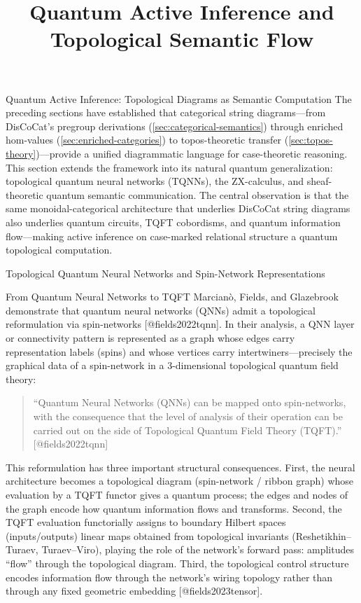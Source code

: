 \documentclass[
  ignorenonframetext,
]{beamer}
\title{\texorpdfstring{Quantum Active Inference and Topological Semantic
Flow}{Quantum Active Inference and Topological Semantic Flow}}
\author{\texorpdfstring{}{}}
\date{}
\begin{document}
\frame{\titlepage}

\begin{frame}{Quantum Active Inference: Topological Diagrams as Semantic
Computation}
\protect{}\label{sec:quantum-active-inference}
The preceding sections have established that categorical string
diagrams---from DisCoCat's pregroup derivations
(\autoref{sec:categorical-semantics}) through enriched hom-values
(\autoref{sec:enriched-categories}) to topos-theoretic transfer
(\autoref{sec:topos-theory})---provide a unified diagrammatic language
for case-theoretic reasoning. This section extends the framework into
its natural quantum generalization: topological quantum neural networks
(TQNNs), the ZX-calculus, and sheaf-theoretic quantum semantic
communication. The central observation is that the same
monoidal-categorical architecture that underlies DisCoCat string
diagrams also underlies quantum circuits, TQFT cobordisms, and quantum
information flow---making active inference on case-marked relational
structure a quantum topological computation.

\begin{block}{Topological Quantum Neural Networks and Spin-Network
Representations}
\protect{}\label{topological-quantum-neural-networks-and-spin-network-representations}
\begin{block}{From Quantum Neural Networks to TQFT}
\protect{}\label{from-quantum-neural-networks-to-tqft}
Marcianò, Fields, and Glazebrook demonstrate that quantum neural
networks (QNNs) admit a topological reformulation via spin-networks
{[}@fields2022tqnn{]}. In their analysis, a QNN layer or connectivity
pattern is represented as a graph whose edges carry representation
labels (spins) and whose vertices carry intertwiners---precisely the
graphical data of a spin-network in a 3-dimensional topological quantum
field theory:

\begin{quote}
``Quantum Neural Networks (QNNs) can be mapped onto spin-networks, with
the consequence that the level of analysis of their operation can be
carried out on the side of Topological Quantum Field Theory (TQFT).''
{[}@fields2022tqnn{]}
\end{quote}

This reformulation has three important structural consequences. First,
the neural architecture becomes a topological diagram (spin-network /
ribbon graph) whose evaluation by a TQFT functor gives a quantum
process; the edges and nodes of the graph encode how quantum information
flows and transforms. Second, the TQFT evaluation functorially assigns
to boundary Hilbert spaces (inputs/outputs) linear maps obtained from
topological invariants (Reshetikhin--Turaev, Turaev--Viro), playing the
role of the network's forward pass: amplitudes ``flow'' through the
topological diagram. Third, the topological control structure encodes
information flow through the network's wiring topology rather than
through any fixed geometric embedding {[}@fields2023tensor{]}.
\end{block}


\end{block}
\end{frame}
\end{document}
